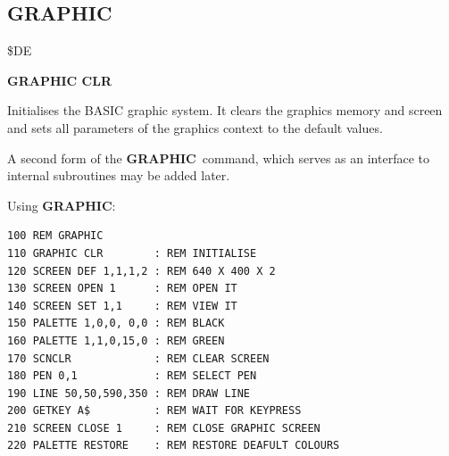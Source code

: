 \subsection{GRAPHIC}
\begin{description}[leftmargin=2cm,style=nextline]
\item [Token:] \$DE
\item [Format:] {\bf GRAPHIC CLR}
\item [Usage:] Initialises the BASIC graphic system.
               It clears the graphics memory and screen and sets
               all parameters of the graphics context to the
               default values.

\item [Remarks:] A second form of the {\bf GRAPHIC} command,
               which serves as an interface to internal
               subroutines may be added later.

\item [Example:] Using {\bf GRAPHIC}:
\begin{tcolorbox}[colback=black,coltext=white]
\verbatimfont{\codefont}
\begin{verbatim}
100 REM GRAPHIC
110 GRAPHIC CLR        : REM INITIALISE
120 SCREEN DEF 1,1,1,2 : REM 640 X 400 X 2
130 SCREEN OPEN 1      : REM OPEN IT
140 SCREEN SET 1,1     : REM VIEW IT
150 PALETTE 1,0,0, 0,0 : REM BLACK
160 PALETTE 1,1,0,15,0 : REM GREEN
170 SCNCLR             : REM CLEAR SCREEN
180 PEN 0,1            : REM SELECT PEN
190 LINE 50,50,590,350 : REM DRAW LINE
200 GETKEY A$          : REM WAIT FOR KEYPRESS
210 SCREEN CLOSE 1     : REM CLOSE GRAPHIC SCREEN
220 PALETTE RESTORE    : REM RESTORE DEAFULT COLOURS
\end{verbatim}
\end{tcolorbox}
\end{description}


\newpage
